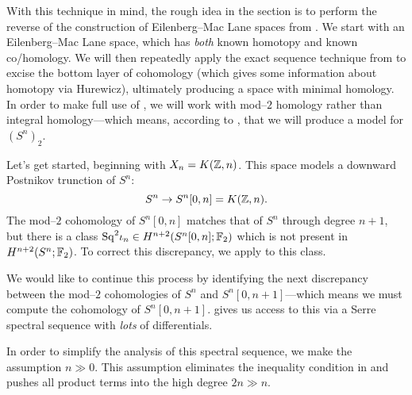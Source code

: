 With this technique in mind, the rough idea in the section is to perform the reverse of the construction of Eilenberg--Mac Lane spaces from .
We start with an Eilenberg--Mac Lane space, which has \emph{both} known homotopy and known co/homology.
We will then repeatedly apply the exact sequence technique from  to excise the bottom layer of cohomology (which gives some information about homotopy via Hurewicz), ultimately producing a space with minimal homology.
In order to make full use of , we will work with mod--$2$ homology rather than integral homology---which means, according to , that we will produce a model for $(S^n)_2$.

Let's get started, beginning with $X_n = K(\mathbb Z, n)$.
This space models a downward Postnikov trunction of $S^n$: \[S^n \to S^n[0, n] = K(\mathbb Z, n).\]
The mod--$2$ cohomology of $S^n[0, n]$ matches that of $S^n$ through degree $n+1$, but there is a class $\mathrm{Sq}^2 \iota_n \in H^{n+2}(S^n[0, n]; \mathbb F_2)$ which is not present in $H^{n+2}(S^n; \mathbb F_2)$.
To correct this discrepancy, we apply  to this class.

We would like to continue this process by identifying the next discrepancy between the mod--$2$ cohomologies of $S^n$ and $S^n[0, n+1]$---which means we must compute the cohomology of $S^n[0, n+1]$.
 gives us access to this via a Serre spectral sequence with \emph{lots} of differentials.

\begin{note}
In order to simplify the analysis of this spectral sequence, we make the assumption $n \gg 0$.
This assumption eliminates the inequality condition in  and pushes all product terms into the high degree $2n \gg n$.
\end{note}

